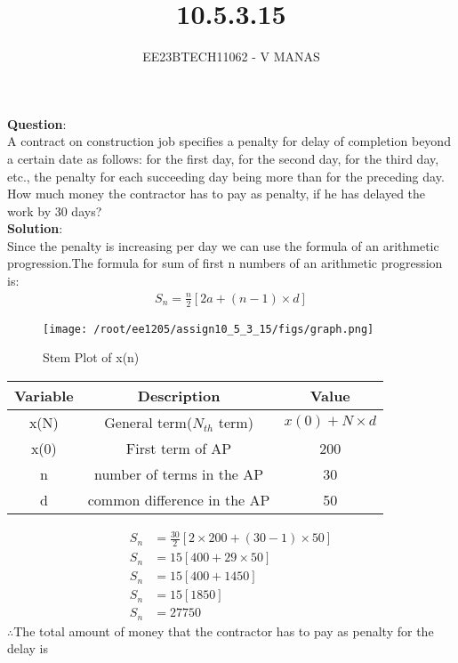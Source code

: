 \documentclass[journal,12pt,twocolumn]{IEEEtran}
\theoremstyle{remark}
\begin{document}

\vspace{3cm}

\title{10.5.3.15}
\author{EE23BTECH11062 - V MANAS}
\maketitle
\newpage

\bigskip

\renewcommand{\thefigure}{\theenumi}
\renewcommand{\thetable}{\theenumi}
\textbf{Question}:\\A contract on construction job specifies a penalty for delay of completion beyond a
certain date as follows:  for the first day,  for the second day,  for the third
day, etc., the penalty for each succeeding day being  more than for the preceding day.
How much money the contractor has to pay as penalty, if he has delayed the work by 30
days?\\
\textbf{Solution}:\\
Since the penalty is increasing  per day we can use the formula of an arithmetic progression.The formula for sum of first n numbers of an arithmetic progression is:
\begin{align}
    S_n=\frac{n}{2}[2a+(n-1)\times d]
\end{align}
\begin{figure}[h]
    \centering
    \texttt{[image: /root/ee1205/assign10\_5\_3\_15/figs/graph.png]}
    \caption{Stem Plot of x(n)}
    \label{stemplot1}
\end{figure}
\begin{tabular}{|c|c|c|}
    \hline
    \textbf{Variable} & \textbf{Description} & \textbf{Value} \\
    \hline
    x(N) & General term($N_{th}$ term) & $x(0)+N\times d$\\
    \hline
    x(0) & First term of AP & 200\\
    \hline
    n & number of terms in the AP & 30\\
    \hline
    d & common difference in the AP & 50\\
    \hline
\end{tabular}
\begin{align}
S_n& =\frac{30}{2}[2\times 200+(30-1)\times 50]\\
S_n& =15[400+29\times 50]\\
S_n& =15[400+1450]\\
S_n& =15[1850]\\
S_n& =27750
\end{align}
$\therefore $The total amount of money that the contractor has to pay as penalty for the delay is $
$
\end{document}
